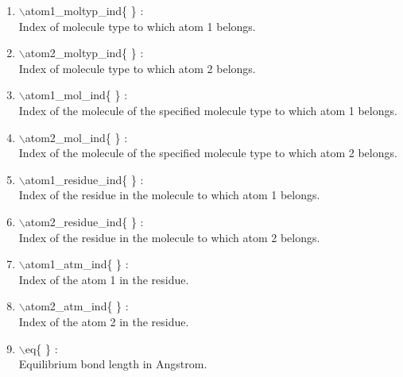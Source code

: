 \documentclass[12pt]{article}
\begin{document}
\begin{enumerate}

 \vspace{0.15in} 
 \item  $\backslash$atom1\_moltyp\_ind\{ \} : \\ 
    Index of molecule type to which atom 1 belongs.

 \vspace{0.15in} 
 \item  $\backslash$atom2\_moltyp\_ind\{ \} : \\ 
    Index of molecule type to which atom 2 belongs.

 \vspace{0.15in} 
 \item  $\backslash$atom1\_mol\_ind\{ \} : \\    
    Index of the molecule of the specified molecule type 
    to which atom 1 belongs.

 \vspace{0.15in} 
 \item  $\backslash$atom2\_mol\_ind\{ \} : \\    
    Index of the molecule of the specified molecule type 
    to which atom 2 belongs.

 \vspace{0.15in} 
 \item  $\backslash$atom1\_residue\_ind\{ \} : \\ 
    Index of the residue in the molecule to which atom 1 belongs.

 \vspace{0.15in} 
 \item  $\backslash$atom2\_residue\_ind\{ \} : \\ 
    Index of the residue in the molecule to which atom 2 belongs.

 \vspace{0.15in} 
 \item  $\backslash$atom1\_atm\_ind\{ \} : \\    
    Index of the atom 1 in the residue.
 
 \vspace{0.15in} 
 \item  $\backslash$atom2\_atm\_ind\{ \} : \\     
    Index of the atom 2 in the residue.
 
 \vspace{0.15in} 
 \item  $\backslash$eq\{ \} : \\               
    Equilibrium bond length in Angstrom.
  

\end{enumerate}
\end{document}
